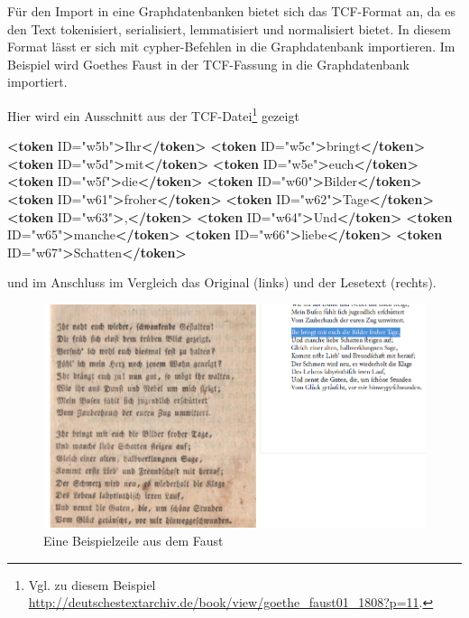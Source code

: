 \documentclass[ngerman,]{scrreprt}
\newenvironment{Shaded}{}{}
\newcommand{\KeywordTok}[1]{\textcolor[rgb]{0.00,0.44,0.13}{\textbf{#1}}}
\newcommand{\StringTok}[1]{\textcolor[rgb]{0.25,0.44,0.63}{#1}}
\newcommand{\OtherTok}[1]{\textcolor[rgb]{0.00,0.44,0.13}{#1}}
\newcommand{\NormalTok}[1]{#1}
\begin{document}
Für den Import in eine Graphdatenbanken bietet sich das TCF-Format an, da es den Text tokenisiert, serialisiert, lemmatisiert und normalisiert bietet. In diesem Format lässt er sich mit cypher-Befehlen in die Graphdatenbank importieren. Im Beispiel wird Goethes Faust in der TCF-Fassung in die Graphdatenbank importiert.

Hier wird ein Ausschnitt aus der TCF-Datei\footnote{Vgl. zu diesem Beispiel \url{http://deutschestextarchiv.de/book/view/goethe_faust01_1808?p=11}.} gezeigt

\begin{Shaded}
\begin{Highlighting}[]
\KeywordTok{<token}\OtherTok{ ID=}\StringTok{"w5b"}\KeywordTok{>}\NormalTok{Ihr}\KeywordTok{</token>}
\KeywordTok{<token}\OtherTok{ ID=}\StringTok{"w5c"}\KeywordTok{>}\NormalTok{bringt}\KeywordTok{</token>}
\KeywordTok{<token}\OtherTok{ ID=}\StringTok{"w5d"}\KeywordTok{>}\NormalTok{mit}\KeywordTok{</token>}
\KeywordTok{<token}\OtherTok{ ID=}\StringTok{"w5e"}\KeywordTok{>}\NormalTok{euch}\KeywordTok{</token>}
\KeywordTok{<token}\OtherTok{ ID=}\StringTok{"w5f"}\KeywordTok{>}\NormalTok{die}\KeywordTok{</token>}
\KeywordTok{<token}\OtherTok{ ID=}\StringTok{"w60"}\KeywordTok{>}\NormalTok{Bilder}\KeywordTok{</token>}
\KeywordTok{<token}\OtherTok{ ID=}\StringTok{"w61"}\KeywordTok{>}\NormalTok{froher}\KeywordTok{</token>}
\KeywordTok{<token}\OtherTok{ ID=}\StringTok{"w62"}\KeywordTok{>}\NormalTok{Tage}\KeywordTok{</token>}
\KeywordTok{<token}\OtherTok{ ID=}\StringTok{"w63"}\KeywordTok{>}\NormalTok{,}\KeywordTok{</token>}
\KeywordTok{<token}\OtherTok{ ID=}\StringTok{"w64"}\KeywordTok{>}\NormalTok{Und}\KeywordTok{</token>}
\KeywordTok{<token}\OtherTok{ ID=}\StringTok{"w65"}\KeywordTok{>}\NormalTok{manche}\KeywordTok{</token>}
\KeywordTok{<token}\OtherTok{ ID=}\StringTok{"w66"}\KeywordTok{>}\NormalTok{liebe}\KeywordTok{</token>}
\KeywordTok{<token}\OtherTok{ ID=}\StringTok{"w67"}\KeywordTok{>}\NormalTok{Schatten}\KeywordTok{</token>}
\end{Highlighting}
\end{Shaded}

und im Anschluss im Vergleich das Original (links) und der Lesetext (rechts).

\begin{figure}
\centering
\includegraphics{Bilder/Faust-S11-Faks.png}
\caption{Eine Beispielzeile aus dem Faust}
\end{figure}
\end{document}
